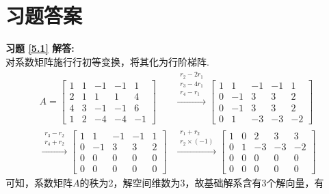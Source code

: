 \documentclass[a4paper]{book}
\begin{document}
\section{习题答案}
\textbf{习题 \ref{5.1} 解答:}\\
对系数矩阵施行行初等变换，将其化为行阶梯阵.
\begin{align*}
A= \begin{bmatrix}1&1&-1&-1&1\\2&1&1&1&4\\4&3&-1&-1&6\\1&2&-4&-4&-1\end{bmatrix} &
   \xrightarrow{\begin{matrix}r_2-2r_1\\r_3-4r_1\\r_4-r_1\end{matrix}}
   \begin{bmatrix}1&1&-1&-1&1\\0&-1&3&3&2\\0&-1&3&3&2\\0&1&-3&-3&-2\end{bmatrix} \\
   \xrightarrow{\begin{matrix}r_3-r_2\\r_4+r_2 \end{matrix}}
   \begin{bmatrix}1&1&-1&-1&1\\0&-1&3&3&2\\0&0&0&0&0\\0&0&0&0&0\end{bmatrix} &
   \xrightarrow{\begin{matrix}r_1+r_2\\r_2\times(-1)\end{matrix}}
   \begin{bmatrix}1&0&2&3&3\\0&1&-3&-3&-2\\0&0&0&0&0\\0&0&0&0&0\end{bmatrix}
\end{align*}
可知，系数矩阵$A$的秩为2，解空间维数为3，故基础解系含有3个解向量，有
\end{document}

